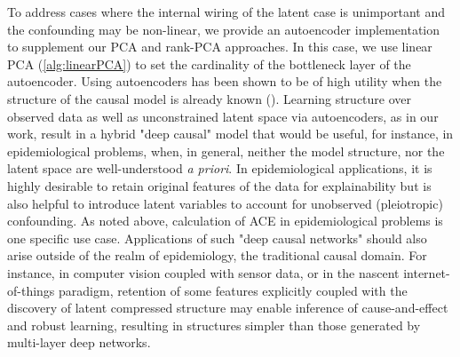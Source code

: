 \documentclass{article}
\begin{document}
To address cases where the internal wiring of the latent case is unimportant and the confounding may be non-linear, we provide an autoencoder implementation to supplement our PCA and rank-PCA approaches.  In this case, we use linear PCA (\ref{alg:linearPCA}) to set the cardinality of the bottleneck layer of the autoencoder.  Using autoencoders has been shown to be of high utility when the structure of the causal model is already known (\cite{louizos_causal_2017}).  Learning structure over observed data as well as unconstrained latent space via autoencoders, as in our work, result in a hybrid "deep causal" model that would be useful, for instance, in epidemiological problems, when, in general, neither the model structure, nor the latent space are well-understood \textit{a priori}.  In epidemiological applications, it is highly desirable to retain original features of the data for explainability but is also helpful to introduce latent variables to account for unobserved (pleiotropic) confounding.  As noted above, calculation of ACE in epidemiological problems is one specific use case.  Applications of such "deep causal networks" should also arise outside of the realm of epidemiology, the traditional causal domain.  For instance, in computer vision coupled with sensor data, or in the nascent internet-of-things paradigm, retention of some features explicitly coupled with the discovery of latent compressed structure may enable inference of cause-and-effect and robust learning, resulting in structures simpler than those generated by multi-layer deep networks.

\clearpage
 
\small


\end{document}
